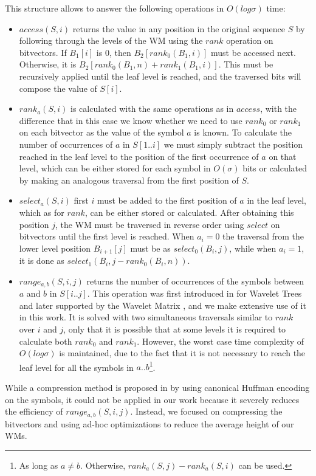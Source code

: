 \documentclass[runningheads]{llncs}
\begin{document}
This structure allows to answer the following operations in $O(log\sigma)$ time:
\begin{itemize}
    \item $access(S,i)$ returns the value in any position in the original sequence $S$ by following through the levels of the WM using the $rank$ operation on bitvectors. If $B_1[i]$ is 0, then $B_2[rank_0(B_1,i)]$ must be accessed next. Otherwise, it is $B_2[rank_0(B_1,n) + rank_1(B_1,i)]$. This must be recursively applied until the leaf level is reached, and the traversed bits will compose the value of $S[i]$.
    \item $rank_a(S,i)$ is calculated with the same operations as in $access$, with the difference that in this case we know whether we need to use $rank_0$ or $rank_1$ on each bitvector as the value of the symbol $a$ is known. To calculate the number of occurrences of $a$ in $S[1..i]$ we must simply subtract the position reached in the leaf level to the position of the first occurrence of $a$ on that level, which can be either stored for each symbol in $O(\sigma)$ bits or calculated by making an analogous traversal from the first position of $S$.
    \item $select_a(S,i)$ first $i$ must be added to the first position of $a$ in the leaf level, which as for $rank$, can be either stored or calculated. After obtaining this position $j$, the WM must be traversed in reverse order using $select$ on bitvectors until the first level is reached. When $a_i=0$ the traversal from the lower level position $B_{i+1}[j]$ must be as $select_0(B_i,j)$, while when $a_i=1$, it is done as $select_1(B_i,j-rank_0(B_{i},n))$.
    \item $range_{a,b}(S,i,j)$ returns the number of occurrences of the symbols between $a$ and $b$ in $S[i..j]$. This operation was first introduced in \cite{gagie2012new} for Wavelet Trees and later supported by the Wavelet Matrix \cite{CNO15}, and we make extensive use of it in this work. It is solved with two simultaneous traversals similar to $rank$ over $i$ and $j$, only that it is possible that at some levels it is required to calculate both $rank_0$ and $rank_1$. However, the worst case time complexity of $O(log\sigma)$ is maintained, due to the fact that it is not necessary to reach the leaf level for all the symbols in $a..b$\footnote{As long as $a\neq b$. Otherwise, $rank_a(S,j)-rank_a(S,i)$ can be used.}.
\end{itemize}

While a compression method is proposed in \cite{CNO15} by using canonical Huffman encoding on the symbols, it could not be applied in our work because it severely reduces the efficiency of $range_{a,b}(S,i,j)$. Instead, we focused on compressing the bitvectors and using ad-hoc optimizations to reduce the average height of our WMs.
\end{document}
